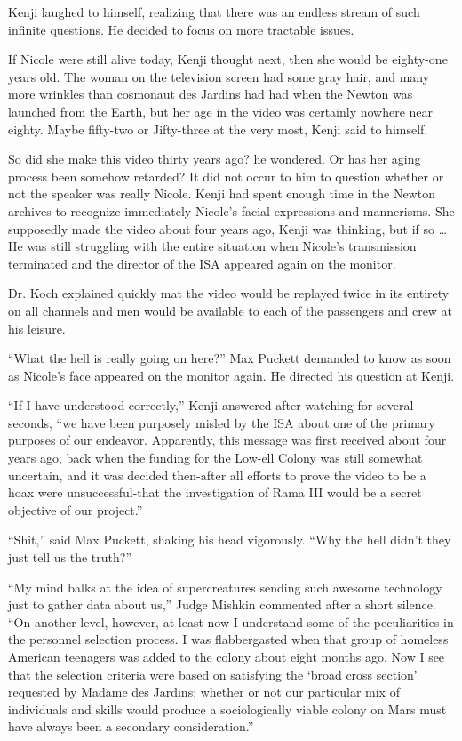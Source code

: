 \documentclass[]{article}
\begin{document}
{Kenji laughed to himself, realizing that there was an endless stream of such infinite questions.  He decided to focus on more tractable issues.

If Nicole were still alive today, Kenji thought next, then she would be eighty-one years old.  The woman on the television screen had some gray hair, and many more wrinkles than cosmonaut des Jardins had had when the Newton was launched from the Earth, but her age in the video was certainly nowhere near eighty.  Maybe fifty-two or Jifty-three at the very most, Kenji said to himself.

So did she make this video thirty years ago? he wondered.  Or has her aging process been somehow retarded? It did not occur to him to question whether or not the speaker was really Nicole.  Kenji had spent enough time in the Newton archives to recognize immediately Nicole’s facial expressions and mannerisms.  She supposedly made the video about four years ago, Kenji was thinking, but if so … He was still struggling with the entire situation when Nicole’s transmission terminated and the director of the ISA appeared again on the monitor.

Dr.  Koch explained quickly mat the video would be replayed twice in its entirety on all channels and men would be available to each of the passengers and crew at his leisure.

“What the hell is really going on here?” Max Puckett demanded to know as soon as Nicole’s face appeared on the monitor again.  He directed his question at Kenji.

“If I have understood correctly,” Kenji answered after watching for several seconds, “we have been purposely misled by the ISA about one of the primary purposes of our endeavor.  Apparently, this message was first received about four years ago, back when the funding for the Low-ell Colony was still somewhat uncertain, and it was decided then-after all efforts to prove the video to be a hoax were unsuccessful-that the investigation of Rama III would be a secret objective of our project.”

“Shit,” said Max Puckett, shaking his head vigorously.  “Why the hell didn’t they just tell us the truth?”

“My mind balks at the idea of supercreatures sending such awesome technology just to gather data about us,” Judge Mishkin commented after a short silence.  “On another level, however, at least now I understand some of the peculiarities in the personnel selection process.  I was flabbergasted when that group of homeless American teenagers was added to the colony about eight months ago.  Now I see that the selection criteria were based on satisfying the ‘broad cross section’ requested by Madame des Jardins; whether or not our particular mix of individuals and skills would produce a sociologically viable colony on Mars must have always been a secondary consideration.”

}
\end{document}
